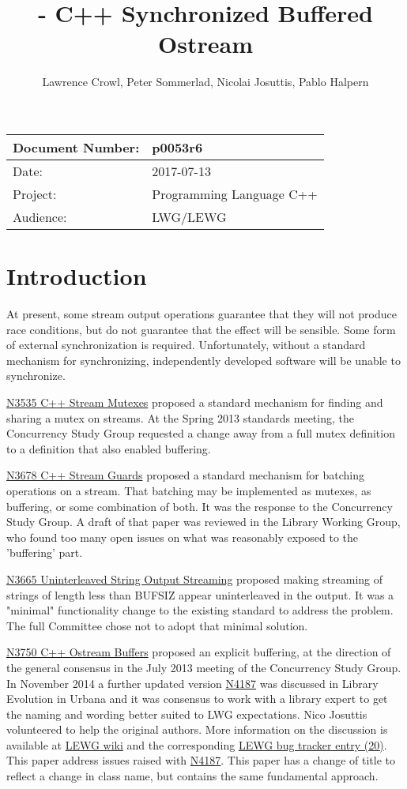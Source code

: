 \documentclass[ebook,11pt,article]{memoir}
\title{\papernumber{} - C++ Synchronized Buffered Ostream}
\author{Lawrence Crowl, Peter Sommerlad, Nicolai Josuttis, Pablo Halpern}
\date{\paperdate}                %
\newcommand{\papernumber}{p0053r6}
\newcommand{\paperdate}{2017-07-13}
\begin{document}
\maketitle
\begin{center}
\begin{tabular}[t]{|l|l|}\hline 
Document Number:&  \papernumber \\\hline
Date: & \paperdate \\\hline
Project: & Programming Language C++\\\hline 
Audience: & LWG/LEWG\\\hline
\end{tabular}
\end{center}
\chapter{Introduction}
At present, some stream output operations guarantee that they will not produce race conditions, but do not guarantee that the effect will be sensible. Some form of external synchronization is required. Unfortunately, without a standard mechanism for synchronizing, independently developed software will be unable to synchronize.

\href{https://wg21.link/n3535}{N3535 C++ Stream Mutexes} proposed a standard mechanism for finding and sharing a mutex on streams. At the Spring 2013 standards meeting, the Concurrency Study Group requested a change away from a full mutex definition to a definition that also enabled buffering.

\href{https://wg21.link/N3678}{N3678 C++ Stream Guards} proposed a standard mechanism for batching operations on a stream. That batching may be implemented as mutexes, as buffering, or some combination of both. It was the response to the Concurrency Study Group. A draft of that paper was reviewed in the Library Working Group, who found too many open issues on what was reasonably exposed to the 'buffering' part.

\href{https://wg21.link/N3665}{N3665 Uninterleaved String Output Streaming} proposed making streaming of strings of length less than BUFSIZ appear uninterleaved in the output. It was a "minimal" functionality change to the existing standard to address the problem. The full Committee chose not to adopt that minimal solution.

\href{https://wg21.link/N3750}{N3750 C++ Ostream Buffers} proposed an explicit buffering, at the direction of the general consensus in the July 2013 meeting of the Concurrency Study Group. In November 2014 a further updated version \href{https://wg21.link/N4187}{N4187} was discussed in Library Evolution in Urbana and it was consensus to work with a library expert to get the naming and wording better suited to LWG expectations. Nico Josuttis volunteered to help the original authors. More information on the discussion is available at \href{http://wiki.edg.com/twiki/bin/view/Wg21urbana-champaign/N4187}{LEWG wiki} and the corresponding \href{https://issues.isocpp.org/show_bug.cgi?id=20}{LEWG bug tracker entry (20)}. This paper address issues raised with \href{https://wg21.link/N4187}{N4187}. This paper has a change of title to reflect a change in class name, but contains the same fundamental approach.
\end{document}
